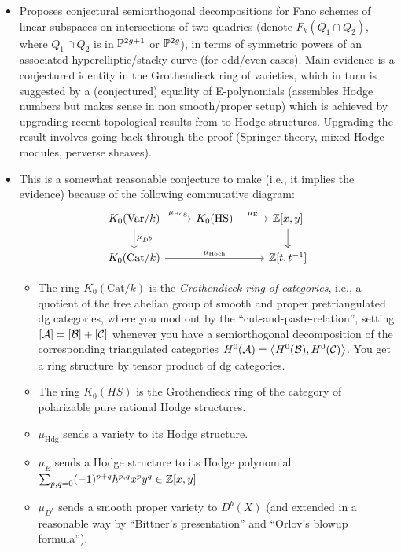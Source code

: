 \documentclass[12pt]{article}
\begin{document}
\begin{itemize}
    \item Proposes conjectural semiorthogonal decompositions for Fano schemes of linear subspaces on intersections of two quadrics (denote $F_k(Q_1\cap Q_2)$, where $Q_1\cap Q_2$ is in $\P^{2g+1}$ or $\P^{2g}$), in terms of symmetric powers of an associated hyperelliptic/stacky curve (for odd/even cases). Main evidence is a conjectured identity in the Grothendieck ring of varieties, which in turn is suggested by a (conjectured) equality of E-polynomials (assembles Hodge numbers but makes sense in non smooth/proper setup) which is achieved by upgrading recent topological results from \cite{Chen_Vilonen_Xue_2020,Chen_Vilonen_Xue_2021} to Hodge structures. Upgrading the result involves going back through the proof (Springer theory, mixed Hodge modules, perverse sheaves).
    \item This is a somewhat reasonable conjecture to make (i.e., it implies the evidence) because of the following commutative diagram:
    \[\begin{tikzcd}
    K_0(\mathrm{Var}/k) \dar["\mu_{D^b}"] \rar["\mu_{\mathrm{Hdg}}"] & K_0(\mathrm{HS}) \rar["\mu_\mathrm{E}"] & \Z[x,y] \dar\\
    K_0(\mathrm{Cat}/k) \ar[rr,"\mu_{\mathrm{Hoch}}"] & & \Z[t,t^{-1}]
    \end{tikzcd}\]
    \begin{itemize}
        \item The ring $K_0(\mathrm{Cat}/k)$ is the \textit{Grothendieck ring of categories}, i.e., a quotient of the free abelian group of smooth and proper pretriangulated dg categories, where you mod out by the ``cut-and-paste-relation'', setting $[\cA]=[\cB]+[\cC]$ whenever you have a semiorthogonal decomposition of the corresponding triangulated categories $H^0(\cA) = \<H^0(\cB), H^0(\cC)\>$. You get a ring structure by tensor product of dg categories.
        \item The ring $K_0(HS)$ is the Grothendieck ring of the category of polarizable pure rational Hodge structures.
        \item $\mu_{\mathrm{Hdg}}$ sends a variety to its Hodge structure.
        \item $\mu_E$ sends a Hodge structure to its Hodge polynomial $\sum_{p,q=0} (-1)^{p+q} h^{p,q} x^p y^q \in \Z[x,y]$
        \item $\mu_{D^b}$ sends a smooth proper variety to $D^b(X)$ (and extended in a reasonable way by ``Bittner's presentation'' and ``Orlov's blowup formula'').

\end{itemize}
\end{itemize}
\end{document}
